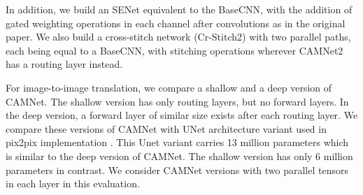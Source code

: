 \documentclass[10pt,twocolumn,letterpaper]{article}
\begin{document}
In addition, we build an SENet \cite{hu2017squeeze} equivalent to the BaseCNN, with the addition of gated weighting operations in each channel after convolutions as in the original paper. We also build a cross-stitch network (Cr-Stitch2) \cite{cross_stich} with two parallel paths, each being equal to a BaseCNN, with stitching operations wherever CAMNet2 has a routing layer instead. 

For image-to-image translation, we compare a shallow and a deep version of CAMNet. The shallow version has only routing layers, but no forward layers. In the deep version, a forward layer of similar size exists after each routing layer. We compare these versions of CAMNet with UNet architecture \cite{ronneberger2015unet} variant used in pix2pix implementation \cite{isola2017image}. This Unet variant carries 13 million parameters which is similar to the deep version of CAMNet. The shallow version has only 6 million parameters in contrast. We consider CAMNet versions with two parallel tensors in each layer in this evaluation.
\end{document}
